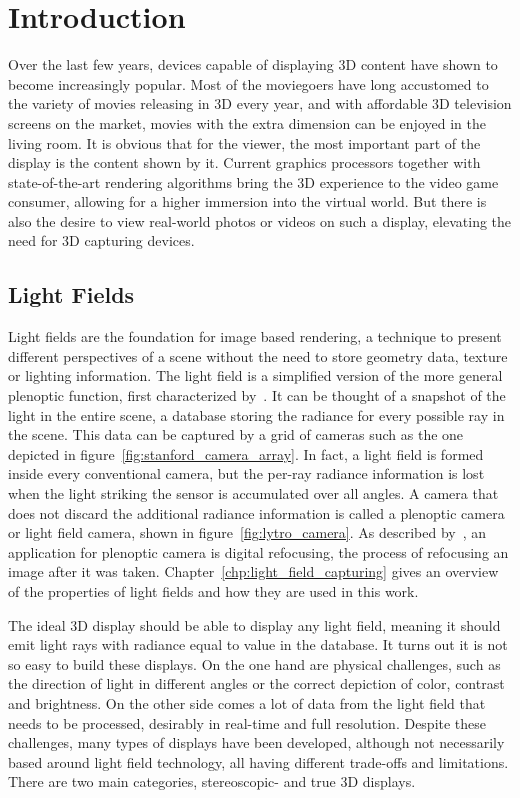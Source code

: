 \chapter{Introduction}
\label{chp:introduction}

Over the last few years, devices capable of displaying 3D content have shown to become increasingly popular.
Most of the moviegoers have long accustomed to the variety of movies releasing in 3D every year, and with affordable 3D television screens on the market, movies with the extra dimension can be enjoyed in the living room.
It is obvious that for the viewer, the most important part of the display is the content shown by it.
Current graphics processors together with state-of-the-art rendering algorithms bring the 3D experience to the video game consumer, allowing for a higher immersion into the virtual world.
But there is also the desire to view real-world photos or videos on such a display, elevating the need for 3D capturing devices.

\section{Light Fields}
Light fields are the foundation for image based rendering, a technique to present different perspectives of a scene without the need to store geometry data, texture or lighting information.
The light field is a simplified version of the more general plenoptic function, first characterized by~\cite{AdelsonBergen}.
It can be thought of a snapshot of the light in the entire scene, a database storing the radiance for every possible ray in the scene.
This data can be captured by a grid of cameras such as the one depicted in figure~\ref{fig:stanford_camera_array}.
In fact, a light field is formed inside every conventional camera, but the per-ray radiance information is lost when the light striking the sensor is accumulated over all angles. 
A camera that does not discard the additional radiance information is called a plenoptic camera or light field camera, shown in figure~\ref{fig:lytro_camera}.
As described by~\cite{LightFieldPhotographyHandHeldPlenopticCamera}, an application for plenoptic camera is digital refocusing, the process of refocusing an image after it was taken.
Chapter~\ref{chp:light_field_capturing} gives an overview of the properties of light fields and how they are used in this work.

The ideal 3D display should be able to display any light field, meaning it should emit light rays with radiance equal to value in the database.
It turns out it is not so easy to build these displays. 
On the one hand are physical challenges, such as the direction of light in different angles or the correct depiction of color, contrast and brightness.
On the other side comes a lot of data from the light field that needs to be processed, desirably in real-time and full resolution.
Despite these challenges, many types of displays have been developed, although not necessarily based around light field technology, all having different trade-offs and limitations.
There are two main categories, stereoscopic- and true 3D displays.

